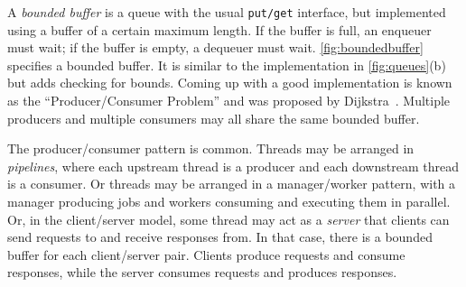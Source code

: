 \documentclass{report}
\newenvironment{code}{
\tcolorbox
}{
\endtcolorbox
}
\begin{document}

A \emph{bounded buffer} is
a queue with the usual \texttt{put/get} interface,
but implemented using a buffer
of a certain maximum length.
If the buffer is full, an enqueuer must wait; if the buffer is empty,
a dequeuer must wait.
\autoref{fig:boundedbuffer} specifies a bounded buffer.
It is similar to the implementation in \autoref{fig:queues}(b) but adds
checking for bounds.
Coming up with a good implementation is known as the
``Producer/Consumer Problem'' and was
proposed by Dijkstra~\cite{EWD329}.
Multiple producers and multiple consumers may all share
the same bounded buffer.

The producer/consumer pattern is common.  Threads may be arranged
in \emph{pipelines},
%
where each upstream thread is a producer and each downstream
thread is a consumer.
Or threads may be arranged in a manager/worker pattern, with a manager
producing jobs and workers consuming and executing them in parallel.
Or, in the client/server model,
%
some thread may act as a \emph{server} that clients can send requests to
and receive responses from.  In that case, there is a bounded buffer
for each client/server pair. Clients produce requests and
consume responses, while the server consumes requests and produces responses.
\end{document}
